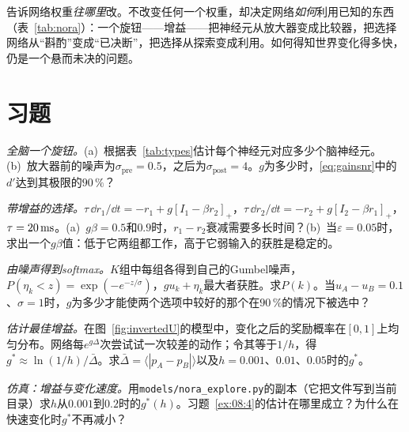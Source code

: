 告诉网络权重\emph{往哪里}改。不改变任何一个权重，却决定网络\emph{如何}利用已知的东西（表~\ref{tab:nora}）：一个旋钮——增益——把神经元从放大器变成比较器，把选择网络从“斟酌”变成“已决断”，把选择从探索变成利用。如何得知世界变化得多快，仍是一个悬而未决的问题。

\section{习题}

\begin{exercise}[\lvlA]
\label{ex:08:1}
\emph{全脑一个旋钮。}(a)~根据表~\ref{tab:types}估计每个神经元对应多少个脑神经元。(b)~放大器前的噪声为$\sigma_{\text{pre}}=0.5$，之后为$\sigma_{\text{post}}=4$。$g$为多少时，\eqref{eq:gainsnr}中的$d'$达到其极限的$90\,\%$？
\end{exercise}

\begin{exercise}[\lvlB]
\label{ex:08:2}
\emph{带增益的选择。}$\tau\,\dd r_1/\dd t=-r_1+g[I_1-\beta r_2]_+$，$\tau\,\dd r_2/\dd t=-r_2+g[I_2-\beta r_1]_+$，$\tau=20\,\text{ms}$。(a)~$g\beta=0.5$和$0.9$时，$r_1-r_2$衰减需要多长时间？(b)~当$\varepsilon=0.05$时，求出一个$g\beta$值：低于它两组都工作，高于它弱输入的获胜是稳定的。
\end{exercise}

\begin{exercise}[\lvlA]
\label{ex:08:3}
\emph{由噪声得到softmax。}$K$组中每组各得到自己的Gumbel噪声，$P(\eta_k<z)=\exp(-e^{-z/\sigma})$，$gu_k+\eta_k$最大者获胜。求$P(k)$。当$u_A-u_B=0.1$、$\sigma=1$时，$g$为多少才能使两个选项中较好的那个在$90\,\%$的情况下被选中？
\end{exercise}

\begin{exercise}[\lvlB]
\label{ex:08:4}
\emph{估计最佳增益。}在图~\ref{fig:invertedU}的模型中，变化之后的奖励概率在$[0,1]$上均匀分布。网络每$e^{g\Delta}$次尝试试一次较差的动作；令其等于$1/h$，得$g^*\approx\ln(1/h)/\bar\Delta$。求$\bar\Delta=\langle|p_A-p_B|\rangle$以及$h=0.001$、$0.01$、$0.05$时的$g^*$。
\end{exercise}

\begin{exercise}[\lvlB]
\label{ex:08:5}
\emph{仿真：增益与变化速度。}用\texttt{models/\allowbreak nora\_explore.py}的副本（它把文件写到当前目录）求$h$从$0.001$到$0.2$时的$g^*(h)$。习题~\ref{ex:08:4}的估计在哪里成立？为什么在快速变化时$g^*$不再减小？
\end{exercise}

